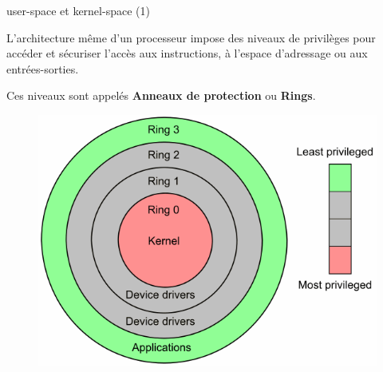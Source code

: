 \documentclass[12pt, t]{beamer}
\begin{document}
\begin{frame}{user-space et kernel-space (1)}

    \vspace{8pt}
    L'architecture même d'un processeur impose des niveaux de privilèges pour
    accéder et sécuriser l'accès aux instructions, à l'espace d'adressage
    ou aux entrées-sorties.

    {
        \vspace{8pt}
        Ces niveaux sont appelés {\textbf{Anneaux de protection} ou \textbf{Rings}}.

        \begin{figure}
            \centering
            \includegraphics[scale=0.25]{ring.png}
        \end{figure}
    }

\end{frame}
\end{document}
